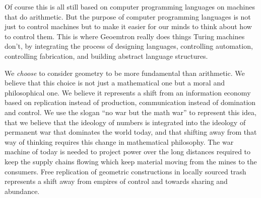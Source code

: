 Of course this is all still based on computer programming languages on
machines that do arithmetic. But the purpose of computer programming
languages is not just to control machines but to make it easier for our
minds to think about how to control them. This is where Geoemtron really
does things Turing machines don't, by integrating the process of
designing languages, controlling automation, controlling fabrication,
and building abstract language structures.

We \emph{choose} to consider geometry to be more fundamental than
arithmetic. We believe that this choice is not just a mathematical one
but a moral and philosophical one. We believe it represents a shift from
an information economy based on replication instead of production,
communication instead of domination and control. We use the slogan ``no
war but the math war'' to represent this idea, that we believe that the
ideology of numbers is integrated into the ideology of permanent war
that dominates the world today, and that shifting away from that way of
thinking requires this change in mathematical philosophy. The war
machine of today is needed to project power over the long distances
required to keep the supply chains flowing which keep material moving
from the mines to the consumers. Free replication of geometric
constructions in locally sourced trash represents a shift away from
empires of control and towards sharing and abundance.
